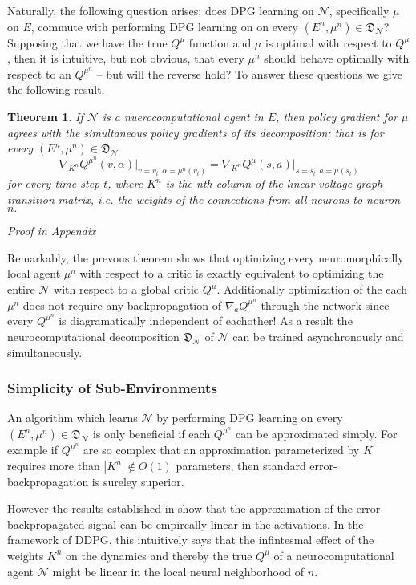 \documentclass{article} %
\newtheorem{theorem}{Theorem}
\numberwithin{equation}{subsection}
\numberwithin{theorem}{subsection}
\theoremstyle{named}
\def\scriptn{{\mathcal N}}
\begin{document}
Naturally, the following question arises: does DPG learning on $\scriptn$, specifically $\mu$ on $E$, commute with performing DPG learning on on every $(E^n, \mu^n) \in \mathfrak{D}_\scriptn$? Supposing that we have the true $Q^\mu$ function and $\mu$ is optimal with respect to $Q^\mu$, then it is intuitive, but not obvious, that every $\mu^n$ should behave optimally with respect to an $Q^{\mu^n}$ -- but will the reverse hold? To answer these questions we give the following result.
\begin{theorem}
    If $\scriptn$ is a nuerocomputational agent in $E$, then policy gradient for $\mu$ agrees with the simultaneous policy gradients of its decomposition; that is for every $(E^n, \mu^n) \in \mathfrak{D}_\scriptn$
    \begin{equation}\label{eq:ncompagrees}
        \nabla_{K^n} Q^{\mu^n}(v,\alpha)\Big|_{v=v_t,\alpha=\mu^n(v_t)} =\nabla_{K^n} Q^{\mu}(s,a)\Big|_{s=s_t,a=\mu(s_t)}
    \end{equation}
    for every time step $t$, where $K^n$ is the nth column of the linear voltage graph transition matrix, i.e. the weights of the connections from all neurons to neuron $n.$
\end{theorem}
\emph{Proof in Appendix}

Remarkably, the prevous theorem shows that optimizing every neuromorphically local agent $\mu^n$ with respect 
to a critic is exactly equivalent to optimizing the entire $\scriptn$ with respect to a global critic $Q^\mu$. 
Additionally optimization of the each $\mu^n$ does not require any backpropagation of $\nabla_a Q^{\mu^n}$ through the network since every $Q^{\mu^n}$ is diagramatically independent of eachother! As a result the neurocomputational decomposition $\mathfrak{D}_\scriptn$ of $\scriptn$ can be trained asynchronously and simultaneously.

\subsubsection{Simplicity of Sub-Environments}
An algorithm which learns $\scriptn$ by performing DPG learning on every $(E^n, \mu^n) \in \mathfrak{D}_\scriptn$ is only beneficial if each $Q^{\mu^n}$ can be approximated simply. For example if $Q^{\mu^n}$ are so complex that an approximation parameterized by $K$ requires more than $|K^n| \notin O(1)$ parameters, then standard error-backpropagation is sureley superior.

However the results established in \cite{DBLP:journals/corr/JaderbergCOVGK16} show that the approximation of the error backpropagated signal can be empircally linear in the activations. In the framework of DDPG, this intuitively says that the infintesmal effect of the weights $K^n$ on the dynamics and thereby the true $Q^\mu$ of a neurocomputational agent $\scriptn$ might be linear in the local neural neighborhood of $n$.
\end{document}
